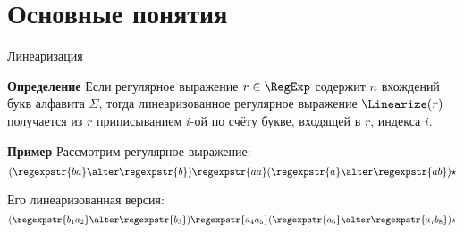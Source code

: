 \section{Основные понятия}
\begin{frame}{Линеаризация}
  \begin{block}{\bf Определение}
    Если регулярное выражение $r\in\RegExp$ содержит $n$ вхождений букв алфавита $\Sigma$, тогда линеаризованное регулярное выражение $\Linearize(r)$ получается из $r$ приписыванием $i$-ой по счёту букве, входящей в $r$, индекса $i$.
  \end{block} %

  \begin{exampleblock}{\bf Пример}
    Рассмотрим регулярное выражение:
    \[(\regexpstr{ba}\alter \regexpstr{b})\regexpstr{aa}(\regexpstr{a}\alter\regexpstr{ab})\star\] %

    Его линеаризованная версия:
    \[(\regexpstr{b_{1}a_{2}}\alter \regexpstr{b_{3}})\regexpstr{a_{4}a_{5}}(\regexpstr{a_{6}}\alter\regexpstr{a_{7}b_{8}})\star\] %

  \end{exampleblock}

\end{frame}